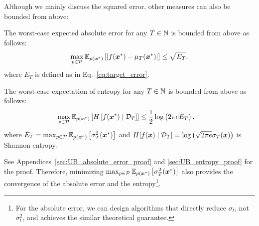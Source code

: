 Although we mainly discuss the squared error, other measures can also be bounded from above:
\begin{lemma}
    The worst-case expected absolute error for any $T \in \mathbb{N}$ is bounded from above as follows:
    \begin{align*}
        \max_{p \in {\cal P}} \mathbb{E}_{p(\boldsymbol{x}^{*})} \left[ |f(\boldsymbol{x}^{*}) - \mu_T(\boldsymbol{x}^{*})| \right]
        \leq \sqrt{E_T},
    \end{align*}
    where $E_T$ is defined as in Eq.~\eqref{eq:target_error}.
    \label{lem:UB_absolute_error}
\end{lemma}
%
\begin{lemma}
    The worst-case expectation of entropy for any $T \in \mathbb{N}$ is bounded from above as follows:
    \begin{align*}
        \max_{p \in {\cal P}} \mathbb{E}_{p(\boldsymbol{x}^{*})} \left[ H\left[ f(\boldsymbol{x}^*) \mid {\cal D}_T \right] \right]
        &\leq \frac{1}{2} \log \left(2 \pi e \tilde{E}_T \right),
    \end{align*}
    where $\tilde{E}_T = \max_{p \in {\cal P}} \mathbb{E}_{p(\boldsymbol{x}^{*})}\left[ \sigma^2_{T}(\boldsymbol{x}^{*}) \right]$ and $H[f(\boldsymbol{x}) \mid {\cal D}_T] = \log \left(\sqrt{2 \pi e} \sigma_T(\boldsymbol{x}) \right)$ is Shannon entropy.
    \label{lem:UB_entropy}
\end{lemma}
%
See Appendices~\ref{sec:UB_absolute_error_proof} and \ref{sec:UB_entropy_proof} for the proof.
%
Therefore, minimizing $\max_{p \in {\cal P}} \mathbb{E}_{p(\boldsymbol{x}^{*})}\left[ \sigma^2_{T}(\boldsymbol{x}^{*}) \right]$ also provides the convergence of the absolute error and the entropy\footnote{For the absolute error, we can design algorithms that directly reduce $\sigma_t$, not $\sigma_t^2$, and achieves the similar theoretical guarantee.}.



